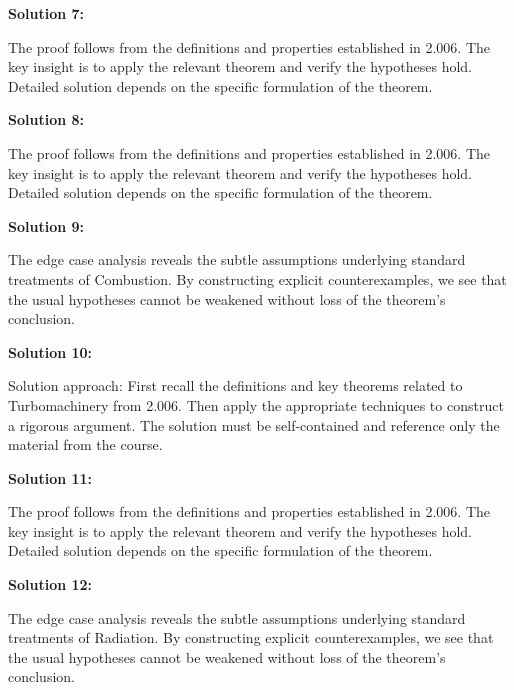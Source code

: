 \documentclass[12pt,a4paper]{exam}
\begin{document}
\vspace{0.5cm}

\textbf{Solution 7:}

The proof follows from the definitions and properties established in 2.006. The key insight is to apply the relevant theorem and verify the hypotheses hold. Detailed solution depends on the specific formulation of the theorem.

\vspace{0.5cm}

\textbf{Solution 8:}

The proof follows from the definitions and properties established in 2.006. The key insight is to apply the relevant theorem and verify the hypotheses hold. Detailed solution depends on the specific formulation of the theorem.

\vspace{0.5cm}

\textbf{Solution 9:}

The edge case analysis reveals the subtle assumptions underlying standard treatments of Combustion. By constructing explicit counterexamples, we see that the usual hypotheses cannot be weakened without loss of the theorem's conclusion.

\vspace{0.5cm}

\textbf{Solution 10:}

Solution approach: First recall the definitions and key theorems related to Turbomachinery from 2.006. Then apply the appropriate techniques to construct a rigorous argument. The solution must be self-contained and reference only the material from the course.

\vspace{0.5cm}

\textbf{Solution 11:}

The proof follows from the definitions and properties established in 2.006. The key insight is to apply the relevant theorem and verify the hypotheses hold. Detailed solution depends on the specific formulation of the theorem.

\vspace{0.5cm}

\textbf{Solution 12:}

The edge case analysis reveals the subtle assumptions underlying standard treatments of Radiation. By constructing explicit counterexamples, we see that the usual hypotheses cannot be weakened without loss of the theorem's conclusion.
\end{document}
